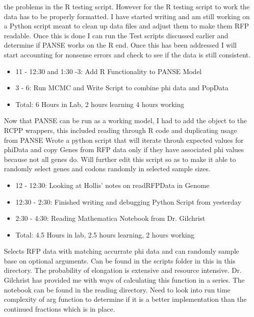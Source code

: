 \documentclass[12pt,hyperref]{labbook}
\begin{document}
the problems in the R testing script. However for the R testing script to work the data has to be properly formatted.
I have started writing and am still working on a Python script meant to clean up data files and adjust them to make them RFP readable. Once this is done I can run the Test scripts discussed earlier and determine if PANSE works on the R end. Once this has been addressed I will start accounting for nonsense errors and check to see if the data is still consistent.
\begin{itemize}
    \item 11 - 12:30 and 1:30 -3: Add R Functionality to PANSE Model
    \item 3 - 6: Run MCMC and Write Script to combine phi data and PopData
    \item Total: 6 Hours in Lab, 2 hours learning 4 hours working
\end{itemize}
Now that PANSE can be run as a working model, I had to add the object to the RCPP wrappers, this included reading through R code and duplicating usage from PANSE
Wrote a python script that will iterate throuh expected values for phiData and copy Genes from RFP data only if they have associated phi values because not all genes do. Will further edit this script so as to make it able to randomly select genes and codons randomly in selected sample sizes.
\begin{itemize}
    \item 12 - 12:30: Looking at Hollis' notes on readRFPData in Genome
    \item 12:30 - 2:30: Finished writing and debugging Python Script from yesterday
    \item 2:30 - 4:30: Reading Mathematica Notebook from Dr. Gilchrist
    \item Total: 4.5 Hours in lab, 2.5 hours learning, 2 hours working
\end{itemize}
Selects RFP data with matching accurrate phi data and can randomly sample base on optional arguments. Can be found in the scripts folder in this
in this directory.
The probability of elongation is extensive and resource intensive. Dr. Gilchrist has provided me with ways of calculating this function in a series. The notebook can be found in the reading directory. Need to look into run time complexity of arg function to determine if it is a better implementation than the continued fractions which is in place.
\end{document}
